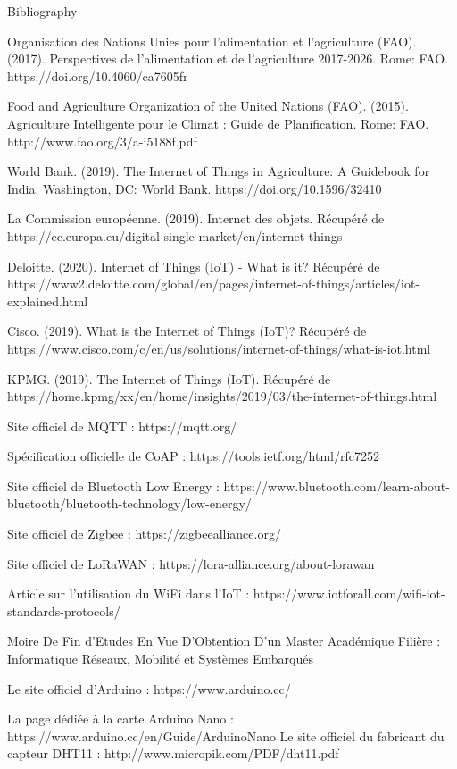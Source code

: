 	\newpage
Bibliography
\begin{flushleft}

	Organisation des Nations Unies pour l'alimentation et l'agriculture (FAO). (2017). Perspectives de l'alimentation et de l'agriculture 2017-2026. Rome: FAO. https://doi.org/10.4060/ca7605fr

    Food and Agriculture Organization of the United Nations (FAO). (2015). Agriculture Intelligente pour le Climat : Guide de Planification. Rome: FAO. http://www.fao.org/3/a-i5188f.pdf

    World Bank. (2019). The Internet of Things in Agriculture: A Guidebook for India. Washington, DC: World Bank. https://doi.org/10.1596/32410

    

    La Commission européenne. (2019). Internet des objets. Récupéré de https://ec.europa.eu/digital-single-market/en/internet-things

    Deloitte. (2020). Internet of Things (IoT) - What is it? Récupéré de https://www2.deloitte.com/global/en/pages/internet-of-things/articles/iot-explained.html

    Cisco. (2019). What is the Internet of Things (IoT)? Récupéré de https://www.cisco.com/c/en/us/solutions/internet-of-things/what-is-iot.html

    KPMG. (2019). The Internet of Things (IoT). Récupéré de https://home.kpmg/xx/en/home/insights/2019/03/the-internet-of-things.html

    Site officiel de MQTT : https://mqtt.org/

    Spécification officielle de CoAP : https://tools.ietf.org/html/rfc7252

    Site officiel de Bluetooth Low Energy : https://www.bluetooth.com/learn-about-bluetooth/bluetooth-technology/low-energy/

    Site officiel de Zigbee : https://zigbeealliance.org/

    Site officiel de LoRaWAN : https://lora-alliance.org/about-lorawan

    Article sur l'utilisation du WiFi dans l'IoT : https://www.iotforall.com/wifi-iot-standards-protocols/
    
    Moire De Fin d’Etudes En Vue D’Obtention D’un Master Académique Filière : Informatique Réseaux, Mobilité et Systèmes Embarqués
    
    Le site officiel d'Arduino : https://www.arduino.cc/

    La page dédiée à la carte Arduino Nano : https://www.arduino.cc/en/Guide/ArduinoNano
        Le site officiel du fabricant du capteur DHT11 : http://www.micropik.com/PDF/dht11.pdf
    

\end{flushleft}
